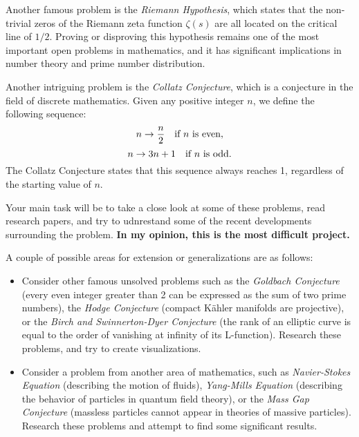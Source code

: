 \documentclass{article}
\begin{document}
\vspace{3mm}
Another famous problem is the \textit{Riemann Hypothesis}, which states that the non-trivial zeros of the Riemann zeta function $\zeta(s)$ are all located on the critical line of $1/2$. Proving or disproving this hypothesis remains one of the most important open problems in mathematics, and it has significant implications in number theory and prime number distribution. 

\vspace{3mm}
Another intriguing problem is the \textit{Collatz Conjecture}, which is a conjecture in the field of discrete mathematics. Given any positive integer $n$, we define the following sequence: $$n \rightarrow \frac{n}{2} \text{\quad if $n$ is even},$$ $$n \rightarrow 3n + 1 \text{\quad if $n$ is odd}.$$ The Collatz Conjecture states that this sequence always reaches 1, regardless of the starting value of $n$.

\vspace{3mm}
Your main task will be to take a close look at some of these problems, read research papers, and try to udnrestand some of the recent developments surrounding the problem. \textbf{In my opinion, this is the most difficult project.}

\vspace{3mm}
A couple of possible areas for extension or generalizations are as follows:
\begin{itemize}
    \item Consider other famous unsolved problems such as the \textit{Goldbach Conjecture} (every even integer greater than 2 can be expressed as the sum of two prime numbers), the \textit{Hodge Conjecture} (compact K\"ahler manifolds are projective), or the \textit{Birch and Swinnerton-Dyer Conjecture} (the rank of an elliptic curve is equal to the order of vanishing at infinity of its L-function). Research these problems, and try to create visualizations.
    \item Consider a problem from another area of mathematics, such as \textit{Navier-Stokes Equation} (describing the motion of fluids), \textit{Yang-Mills Equation} (describing the behavior of particles in quantum field theory), or the \textit{Mass Gap Conjecture} (massless particles cannot appear in theories of massive particles). Research these problems and attempt to find some significant results.
\end{itemize}
\end{document}
